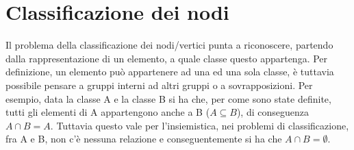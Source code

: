 \section{Classificazione dei nodi}
Il problema della classificazione dei nodi/vertici punta a riconoscere, partendo dalla rappresentazione di un elemento, a quale classe questo appartenga. Per definizione, un elemento può appartenere ad una ed una sola classe, è tuttavia possibile pensare a gruppi interni ad altri gruppi o a sovrapposizioni. Per esempio, data la classe A e la classe B si ha che, per come sono state definite, tutti gli elementi di A appartengono anche a B ($ A \subseteq B$), di conseguenza $ A \cap B = A$. Tuttavia questo vale per l'insiemistica, nei problemi di classificazione, fra A e B, non c'è nessuna relazione e conseguentemente si ha che $ A \cap B = \emptyset$.%
%
